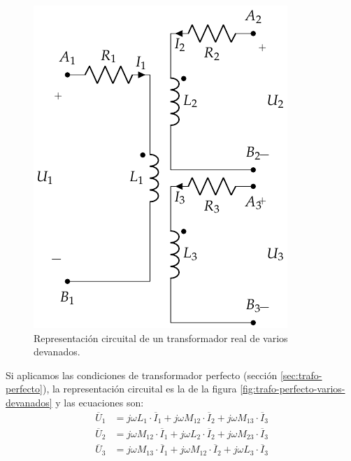 \begin{figure}
  \centering
  \includegraphics[height=0.25\textheight]{../figs/TrafoVariosDevanados.pdf}
  \caption{Representación circuital de un transformador real de varios devanados.}
  \label{fig:trafo-varios-devanados}
\end{figure}


Si aplicamos las condiciones de transformador perfecto (sección \ref{sec:trafo-perfecto}), la representación circuital es la de la figura \ref{fig:trafo-perfecto-varios-devanados} y las ecuaciones son:
  \begin{align*}
  \overline{U}_1 &= j \omega L_1 \cdot \overline{I}_1 + j \omega M_{12} \cdot\overline{I}_2 + j \omega M_{13} \cdot\overline{I}_3\\
  \overline{U}_2 &= j \omega M_{12} \cdot \overline{I}_1 + j \omega L_2 \cdot \overline{I}_2 + j \omega M_{23} \cdot \overline{I}_3\\
  \overline{U}_3 &= j \omega M_{13} \cdot \overline{I}_1 + j \omega M_{12} \cdot\overline{I}_2 + j \omega L_3 \cdot \overline{I}_3
\end{align*}

